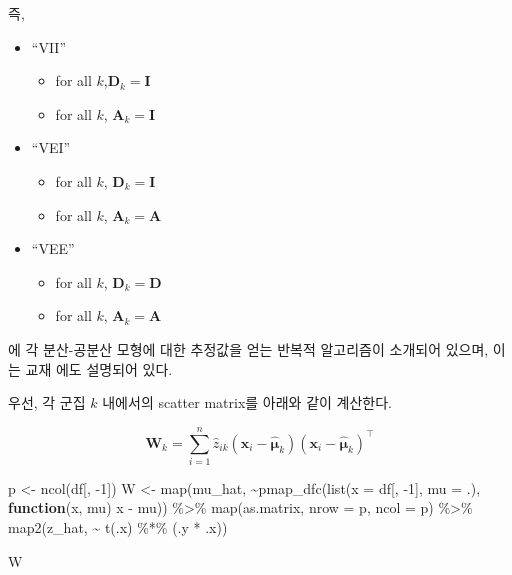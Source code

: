 \documentclass[
]{book}
\newenvironment{Shaded}{\begin{snugshade}}{\end{snugshade}}
\newcommand{\AttributeTok}[1]{\textcolor[rgb]{0.77,0.63,0.00}{#1}}
\newcommand{\ControlFlowTok}[1]{\textcolor[rgb]{0.13,0.29,0.53}{\textbf{#1}}}
\newcommand{\DecValTok}[1]{\textcolor[rgb]{0.00,0.00,0.81}{#1}}
\newcommand{\FunctionTok}[1]{\textcolor[rgb]{0.00,0.00,0.00}{#1}}
\newcommand{\NormalTok}[1]{#1}
\newcommand{\OtherTok}[1]{\textcolor[rgb]{0.56,0.35,0.01}{#1}}
\newcommand{\SpecialCharTok}[1]{\textcolor[rgb]{0.00,0.00,0.00}{#1}}
\providecommand{\tightlist}{%
  \setlength{\itemsep}{0pt}\setlength{\parskip}{0pt}}
\begin{document}
즉,

\begin{itemize}
\tightlist
\item
  ``VII''

  \begin{itemize}
  \tightlist
  \item
    for all \(k\),\(\mathbf{D}_k = \mathbf{I}\)
  \item
    for all \(k\), \(\mathbf{A}_k = \mathbf{I}\)
  \end{itemize}
\item
  ``VEI''

  \begin{itemize}
  \tightlist
  \item
    for all \(k\), \(\mathbf{D}_k = \mathbf{I}\)
  \item
    for all \(k\), \(\mathbf{A}_k = \mathbf{A}\)
  \end{itemize}
\item
  ``VEE''

  \begin{itemize}
  \tightlist
  \item
    for all \(k\), \(\mathbf{D}_k = \mathbf{D}\)
  \item
    for all \(k\), \(\mathbf{A}_k = \mathbf{A}\)
  \end{itemize}
\end{itemize}

\citet{celeux1995gaussian} 에 각 분산-공분산 모형에 대한 추정값을 얻는 반복적 알고리즘이 소개되어 있으며, 이는 교재 \citep{jun2012datamining}에도 설명되어 있다.

우선, 각 군집 \(k\) 내에서의 scatter matrix를 아래와 같이 계산한다.

\begin{equation*}
\mathbf{W}_k = \sum_{i = 1}^{n} \hat{z}_{ik} (\mathbf{x}_i - \hat{\boldsymbol\mu}_k)(\mathbf{x}_i - \hat{\boldsymbol\mu}_k)^\top
\end{equation*}

\begin{Shaded}
\begin{Highlighting}[]
\NormalTok{p }\OtherTok{\textless{}{-}} \FunctionTok{ncol}\NormalTok{(df[, }\SpecialCharTok{{-}}\DecValTok{1}\NormalTok{])}
\NormalTok{W }\OtherTok{\textless{}{-}} \FunctionTok{map}\NormalTok{(mu\_hat, }
    \SpecialCharTok{\textasciitilde{}}\FunctionTok{pmap\_dfc}\NormalTok{(}\FunctionTok{list}\NormalTok{(}\AttributeTok{x =}\NormalTok{ df[, }\SpecialCharTok{{-}}\DecValTok{1}\NormalTok{], }\AttributeTok{mu =}\NormalTok{ .),}
             \ControlFlowTok{function}\NormalTok{(x, mu) x }\SpecialCharTok{{-}}\NormalTok{ mu)) }\SpecialCharTok{\%\textgreater{}\%}
  \FunctionTok{map}\NormalTok{(as.matrix, }\AttributeTok{nrow =}\NormalTok{ p, }\AttributeTok{ncol =}\NormalTok{ p) }\SpecialCharTok{\%\textgreater{}\%}
  \FunctionTok{map2}\NormalTok{(z\_hat, }\SpecialCharTok{\textasciitilde{}} \FunctionTok{t}\NormalTok{(.x) }\SpecialCharTok{\%*\%}\NormalTok{ (.y }\SpecialCharTok{*}\NormalTok{ .x))}

\NormalTok{W}
\end{Highlighting}
\end{Shaded}
\end{document}
